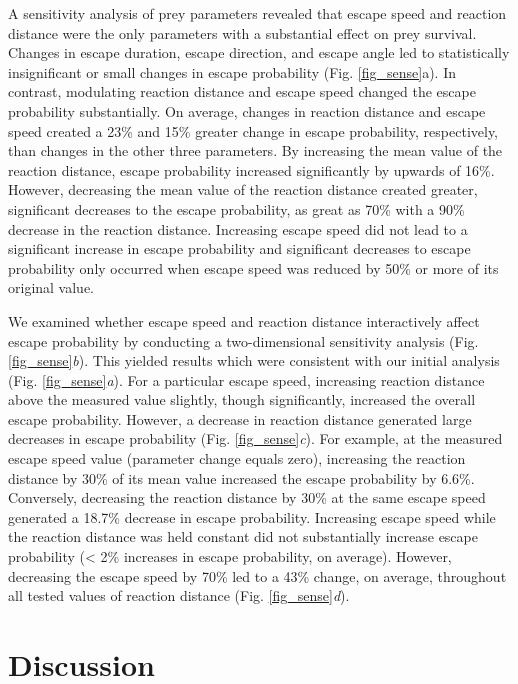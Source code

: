 \documentclass[]{rsos}%
\begin{document}
A sensitivity analysis of prey parameters revealed that escape speed and reaction distance were the only parameters with a substantial effect on prey survival. 
Changes in escape duration, escape direction, and escape angle led to statistically insignificant or small changes in escape probability (Fig. \ref{fig_sense}a). 
In contrast, modulating reaction distance and escape speed changed the escape probability substantially.
On average, changes in reaction distance and escape speed created a 23\% and 15\% greater change in escape probability, respectively, than changes in the other three parameters.
By increasing the mean value of the reaction distance, escape probability increased significantly by upwards of 16\%. 
However, decreasing the mean value of the reaction distance created greater, significant decreases to the escape probability, as great as 70\% with a 90\% decrease in the reaction distance. 
Increasing escape speed did not lead to a significant increase in escape probability and significant decreases to escape probability only occurred when escape speed was reduced by 50\% or more of its original value.

We examined whether escape speed and reaction distance interactively affect escape probability by conducting a two-dimensional sensitivity analysis (Fig. \ref{fig_sense}\textit{b}).
This yielded results which were consistent with our initial analysis (Fig. \ref{fig_sense}\textit{a}). 
For a particular escape speed, increasing reaction distance above the measured value slightly, though significantly, increased the overall escape probability. 
However, a decrease in reaction distance generated large decreases in escape probability (Fig. \ref{fig_sense}\textit{c}). 
For example, at the measured escape speed value (parameter change equals zero), increasing the reaction distance by 30\% of its mean value increased the escape probability by 6.6\%. 
Conversely, decreasing the reaction distance by 30\% at the same escape speed generated a 18.7\% decrease in escape probability.
Increasing escape speed while the reaction distance was held constant did not substantially increase escape probability (< 2\% increases in escape probability, on average).
However, decreasing the escape speed by 70\% led to a 43\% change, on average, throughout all tested values of reaction distance (Fig. \ref{fig_sense}\textit{d}).



\section{Discussion}%
\end{document}
